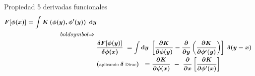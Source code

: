 \vspace{5mm}
\begin{myblock}{Propiedad 5 derivadas funcionales}
\begin{equation}
\begin{split}
\boldsymbol{
F[\phi(x)]= \displaystyle \int K \left(\phi(y),\phi'(y) \right)\ \dd y }
& \\boldsymbol{ \Rightarrow } \  \\
& \boldsymbol{\fdv{F[\phi(y)]}{\phi(x)} \ = \int \dd y \ \left[ \pdv{K}{\phi(y)} - \pdv{y} \left( \pdv{K}{\phi'(y)}\right) \right]\ \delta(y-x) } \ \\ 
& \boldsymbol{(\text{\scriptsize{aplicando} } \delta \text{\scriptsize{ Dirac}} ) \ \ =\pdv{K}{\phi(x)} \ - \ \pdv{x} \left[ \pdv{K}{\phi'(x)} \right]	  } 
 \end{split}
 \end{equation}
\end{myblock}




































